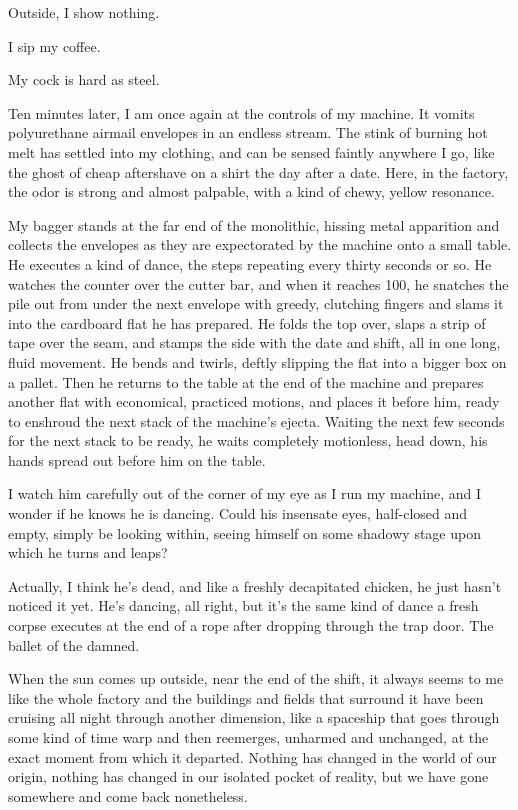 Outside, I show nothing.



I sip my coffee.



My cock is hard as steel.



Ten minutes later, I am once again at the controls of my machine.
It vomits polyurethane airmail envelopes in an endless stream. The
stink of burning hot melt has settled into my clothing, and can be
sensed faintly anywhere I go, like the ghost of cheap aftershave on
a shirt the day after a date. Here, in the factory, the odor is
strong and almost palpable, with a kind of chewy, yellow
resonance.



My bagger stands at the far end of the monolithic, hissing metal
apparition and collects the envelopes as they are expectorated by
the machine onto a small table. He executes a kind of dance, the
steps repeating every thirty seconds or so. He watches the counter
over the cutter bar, and when it reaches 100, he snatches the pile
out from under the next envelope with greedy, clutching fingers and
slams it into the cardboard flat he has prepared. He folds the top
over, slaps a strip of tape over the seam, and stamps the side with
the date and shift, all in one long, fluid movement. He bends and
twirls, deftly slipping the flat into a bigger box on a pallet.
Then he returns to the table at the end of the machine and prepares
another flat with economical, practiced motions, and places it
before him, ready to enshroud the next stack of the machine's
ejecta. Waiting the next few seconds for the next stack to be
ready, he waits completely motionless, head down, his hands spread
out before him on the table.



I watch him carefully out of the corner of my eye as I run my
machine, and I wonder if he knows he is dancing. Could his
insensate eyes, half-closed and empty, simply be looking within,
seeing himself on some shadowy stage upon which he turns and
leaps?



Actually, I think he's dead, and like a freshly decapitated
chicken, he just hasn't noticed it yet. He's dancing,
all right, but it's the same kind of dance a fresh corpse
executes at the end of a rope after dropping through the trap door.
The ballet of the damned.



When the sun comes up outside, near the end of the shift, it always
seems to me like the whole factory and the buildings and fields
that surround it have been cruising all night through another
dimension, like a spaceship that goes through some kind of time
warp and then reemerges, unharmed and unchanged, at the exact
moment from which it departed. Nothing has changed in the world of
our origin, nothing has changed in our isolated pocket of reality,
but we have gone somewhere and come back nonetheless.



